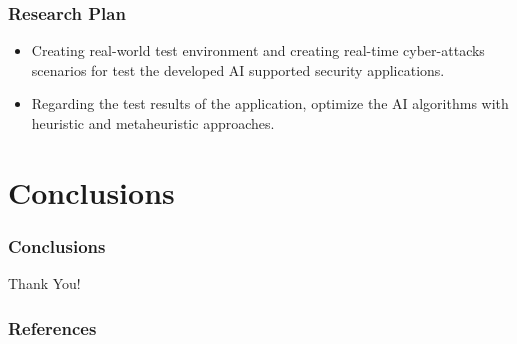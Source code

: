 \documentclass[slidestop,usepdftitle=false]{beamer}
\begin{document}
\begin{frame}
  \frametitle{Research Plan} 
   \begin{slide}
    \begin{itemize}
      \item {
        Creating real-world test environment and creating real-time cyber-attacks scenarios for test the developed AI supported security applications.
    }
 
    \item {
        Regarding the test results of the application, optimize the AI algorithms with heuristic and metaheuristic approaches.  
    }
     \end{itemize}
   \end{slide}
\end{frame}

\section{Conclusions}  
  \begin{frame}%
  \frametitle{Conclusions}  
  \begin{center}
  {\fontsize{42.99}{50}\selectfont Thank You!}
  \end{center}
  \end{frame}

\begin{frame}[allowframebreaks]
    \frametitle{References}
    
\end{frame}
\end{document}
